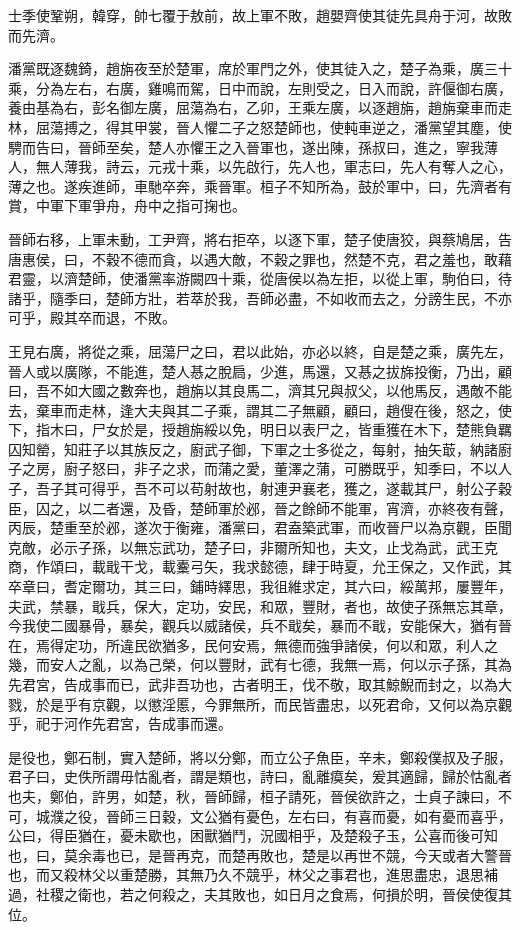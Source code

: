 \begin{pinyinscope}
士季使鞏朔，韓穿，帥七覆于敖前，故上軍不敗，趙嬰齊使其徒先具舟于河，故敗而先濟。

潘黨既逐魏錡，趙旃夜至於楚軍，席於軍門之外，使其徒入之，楚子為乘，廣三十乘，分為左右，右廣，雞鳴而駕，日中而說，左則受之，日入而說，許偃御右廣，養由基為右，彭名御左廣，屈蕩為右，乙卯，王乘左廣，以逐趙旃，趙旃棄車而走林，屈蕩搏之，得其甲裳，晉人懼二子之怒楚師也，使軘車逆之，潘黨望其塵，使騁而告曰，晉師至矣，楚人亦懼王之入晉軍也，遂出陳，孫叔曰，進之，寧我薄人，無人薄我，詩云，元戎十乘，以先啟行，先人也，軍志曰，先人有奪人之心，薄之也。遂疾進師，車馳卒奔，乘晉軍。桓子不知所為，鼓於軍中，曰，先濟者有賞，中軍下軍爭舟，舟中之指可掬也。

晉師右移，上軍未動，工尹齊，將右拒卒，以逐下軍，楚子使唐狡，與蔡鳩居，告唐惠侯，曰，不穀不德而貪，以遇大敵，不穀之罪也，然楚不克，君之羞也，敢藉君靈，以濟楚師，使潘黨率游闕四十乘，從唐侯以為左拒，以從上軍，駒伯曰，待諸乎，隨季曰，楚師方壯，若萃於我，吾師必盡，不如收而去之，分謗生民，不亦可乎，殿其卒而退，不敗。

王見右廣，將從之乘，屈蕩尸之曰，君以此始，亦必以終，自是楚之乘，廣先左，晉人或以廣隊，不能進，楚人惎之脫扃，少進，馬還，又惎之拔旆投衡，乃出，顧曰，吾不如大國之數奔也，趙旃以其良馬二，濟其兄與叔父，以他馬反，遇敵不能去，棄車而走林，逢大夫與其二子乘，謂其二子無顧，顧曰，趙傁在後，怒之，使下，指木曰，尸女於是，授趙旃綏以免，明日以表尸之，皆重獲在木下，楚熊負羈囚知罃，知莊子以其族反之，廚武子御，下軍之士多從之，每射，抽矢菆，納諸廚子之房，廚子怒曰，非子之求，而蒲之愛，董澤之蒲，可勝既乎，知季曰，不以人子，吾子其可得乎，吾不可以苟射故也，射連尹襄老，獲之，遂載其尸，射公子穀臣，囚之，以二者還，及昏，楚師軍於邲，晉之餘師不能軍，宵濟，亦終夜有聲，丙辰，楚重至於邲，遂次于衡雍，潘黨曰，君盍築武軍，而收晉尸以為京觀，臣聞克敵，必示子孫，以無忘武功，楚子曰，非爾所知也，夫文，止戈為武，武王克商，作頌曰，載戢干戈，載櫜弓矢，我求懿德，肆于時夏，允王保之，又作武，其卒章曰，耆定爾功，其三曰，鋪時繹思，我徂維求定，其六曰，綏萬邦，屢豐年，夫武，禁暴，戢兵，保大，定功，安民，和眾，豐財，者也，故使子孫無忘其章，今我使二國暴骨，暴矣，觀兵以威諸侯，兵不戢矣，暴而不戢，安能保大，猶有晉在，焉得定功，所違民欲猶多，民何安焉，無德而強爭諸侯，何以和眾，利人之幾，而安人之亂，以為己榮，何以豐財，武有七德，我無一焉，何以示子孫，其為先君宮，告成事而已，武非吾功也，古者明王，伐不敬，取其鯨鯢而封之，以為大戮，於是乎有京觀，以懲淫慝，今罪無所，而民皆盡忠，以死君命，又何以為京觀乎，祀于河作先君宮，告成事而還。

是役也，鄭石制，實入楚師，將以分鄭，而立公子魚臣，辛未，鄭殺僕叔及子服，君子曰，史佚所謂毋怙亂者，謂是類也，詩曰，亂離瘼矣，爰其適歸，歸於怙亂者也夫，鄭伯，許男，如楚，秋，晉師歸，桓子請死，晉侯欲許之，士貞子諫曰，不可，城濮之役，晉師三日穀，文公猶有憂色，左右曰，有喜而憂，如有憂而喜乎，公曰，得臣猶在，憂未歇也，困獸猶鬥，況國相乎，及楚殺子玉，公喜而後可知也，曰，莫余毒也已，是晉再克，而楚再敗也，楚是以再世不競，今天或者大警晉也，而又殺林父以重楚勝，其無乃久不競乎，林父之事君也，進思盡忠，退思補過，社稷之衛也，若之何殺之，夫其敗也，如日月之食焉，何損於明，晉侯使復其位。


\end{pinyinscope}

